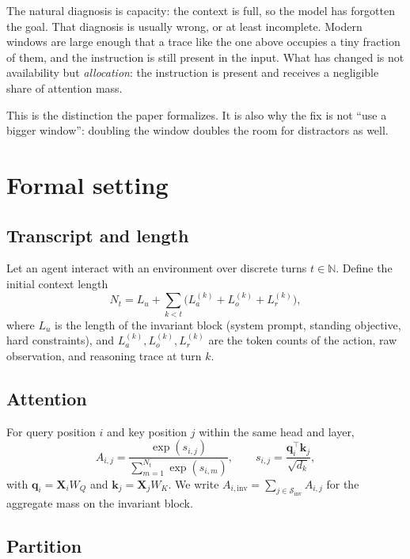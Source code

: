 \documentclass[11pt,a4paper]{article}
\theoremstyle{plain}
\theoremstyle{definition}
\theoremstyle{remark}
\newcommand{\Sinv}{\mathcal{S}_{\mathrm{inv}}}
\newcommand{\Ainv}{A_{i,\mathrm{inv}}}
\begin{document}
The natural diagnosis is capacity: the context is full, so the model has
forgotten the goal. That diagnosis is usually wrong, or at least incomplete.
Modern windows are large enough that a trace like the one above occupies a tiny
fraction of them, and the instruction is still present in the input. What has
changed is not availability but \emph{allocation}: the instruction is present
and receives a negligible share of attention mass.

This is the distinction the paper formalizes. It is also why the fix is not
``use a bigger window'': doubling the window doubles the room for distractors as
well.

\section{Formal setting}
\label{sec:prelim}

\subsection{Transcript and length}

Let an agent interact with an environment over discrete turns $t \in
\mathbb{N}$. Define the initial context length
\begin{equation}
  N_t = L_u + \sum_{k<t}\bigl(L_a^{(k)} + L_o^{(k)} + L_r^{(k)}\bigr),
\end{equation}
where $L_u$ is the length of the invariant block (system prompt, standing
objective, hard constraints), and $L_a^{(k)}, L_o^{(k)}, L_r^{(k)}$ are the
token counts of the action, raw observation, and reasoning trace at turn $k$.

\subsection{Attention}

For query position $i$ and key position $j$ within the same head and layer,
\begin{equation}
  A_{i,j}
  = \frac{\exp(s_{i,j})}{\sum_{m=1}^{N_t}\exp(s_{i,m})},
  \qquad
  s_{i,j} = \frac{\mathbf{q}_i^{\top}\mathbf{k}_j}{\sqrt{d_k}},
  \label{eq:attn}
\end{equation}
with $\mathbf{q}_i = \mathbf{X}_i W_Q$ and $\mathbf{k}_j = \mathbf{X}_j W_K$.
We write $\Ainv = \sum_{j \in \Sinv} A_{i,j}$ for the aggregate mass on the
invariant block.

\subsection{Partition}
\end{document}
